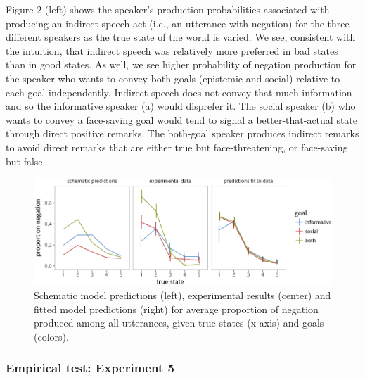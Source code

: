Figure 2 (left) shows the speaker's production probabilities associated %
with producing an indirect speech act (i.e., an utterance with negation)
for the three different speakers as the true state of the world is
varied. We see, consistent with the intuition, that indirect speech was
relatively more preferred in bad states than in good states. As well, we
see higher probability of negation production for the speaker who wants
to convey both goals (epistemic and social) relative to each goal
independently. Indirect speech does not convey that much information and
so the informative speaker (a) would disprefer it. The social speaker
(b) who wants to convey a face-saving goal would tend to signal a
better-that-actual state through direct positive remarks. The both-goal
speaker produces indirect remarks to avoid direct remarks that are
either true but face-threatening, or face-saving but false.

\begin{CodeChunk}
\begin{figure}[t]

{\centering \includegraphics{figures/exptModelNeg-1} 

}

\caption[Schematic model predictions (left), experimental results (center) and fitted model predictions (right) for average proportion of negation produced among all utterances, given true states (x-axis) and goals (colors)]{Schematic model predictions (left), experimental results (center) and fitted model predictions (right) for average proportion of negation produced among all utterances, given true states (x-axis) and goals (colors).}\label{fig:model_pred_negNoneg}
\end{figure}
\end{CodeChunk}


\subsubsection{Empirical test: Experiment 5} 

